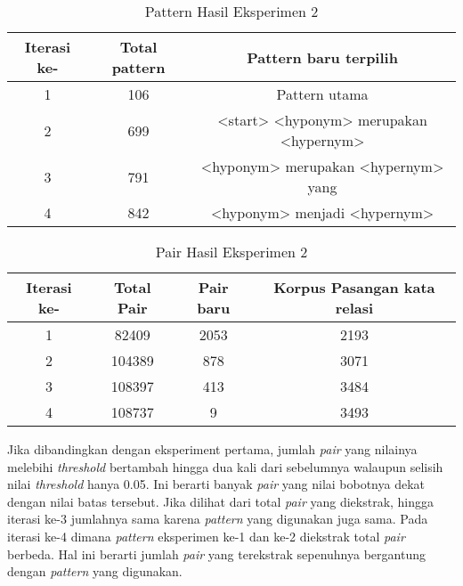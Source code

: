 \begin{table}
  \centering
  \caption{Pattern Hasil Eksperimen 2}
  \label{table:eksp2-pattern}
  \begin{tabular}{|c|c|c|}
  \hline
    Iterasi ke- & Total pattern & Pattern baru terpilih \\ \hline
    1 & 106 & Pattern utama \\ \hline
    2 & 699 & <start> <hyponym> merupakan <hypernym> \\ \hline
    3 & 791 & <hyponym> merupakan <hypernym> yang \\ \hline
    4 & 842 & <hyponym> menjadi <hypernym> \\ \hline
  \end{tabular} 
\end{table}

\begin{table}
  \centering
  \caption{Pair Hasil Eksperimen 2}
  \label{table:eksp2-pair}
  \begin{tabular}{|c|c|c|c|}
  \hline
  Iterasi ke-  & Total Pair & Pair baru & Korpus Pasangan kata relasi \\ \hline
  1 & 82409 & 2053 & 2193 \\ \hline
  2 & 104389 & 878 & 3071 \\ \hline
  3 & 108397 & 413 & 3484 \\ \hline
  4 & 108737 & 9 & 3493 \\ \hline
  \end{tabular} 
\end{table}

\noindent Jika dibandingkan dengan eksperiment pertama, jumlah \textit{pair} yang nilainya melebihi \textit{threshold} bertambah hingga dua kali dari sebelumnya walaupun selisih nilai \textit{threshold} hanya 0.05. Ini berarti banyak \textit{pair} yang nilai bobotnya dekat dengan nilai batas tersebut. Jika dilihat dari total \textit{pair} yang diekstrak, hingga iterasi ke-3 jumlahnya sama karena \textit{pattern} yang digunakan juga sama. Pada iterasi ke-4 dimana \textit{pattern} eksperimen ke-1 dan ke-2 diekstrak total \textit{pair} berbeda. Hal ini berarti jumlah \textit{pair} yang terekstrak sepenuhnya bergantung dengan \textit{pattern} yang digunakan.


